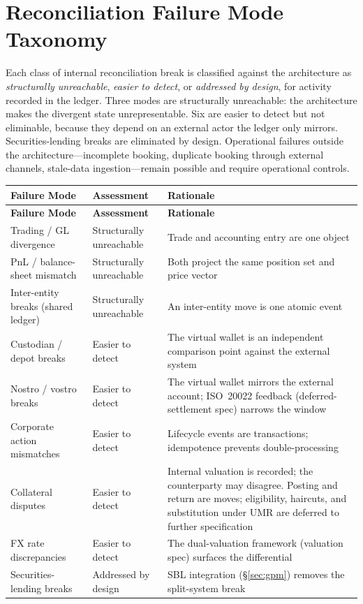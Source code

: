 \section{Reconciliation Failure Mode Taxonomy}
\label{sec:appC}\label{app:reconciliation}

Each class of internal reconciliation break is classified against the architecture as \emph{structurally unreachable}, \emph{easier to detect}, or \emph{addressed by design}, for activity recorded in the ledger. Three modes are structurally unreachable: the architecture makes the divergent state unrepresentable. Six are easier to detect but not eliminable, because they depend on an external actor the ledger only mirrors. Securities-lending breaks are eliminated by design. Operational failures outside the architecture---incomplete booking, duplicate booking through external channels, stale-data ingestion---remain possible and require operational controls.

\begin{center}
\begin{longtable}{p{4.3cm} p{3cm} p{5.7cm}}
\toprule
\textbf{Failure Mode} & \textbf{Assessment} & \textbf{Rationale} \\
\midrule
\endfirsthead
\toprule
\textbf{Failure Mode} & \textbf{Assessment} & \textbf{Rationale} \\
\midrule
\endhead
Trading / GL divergence & Structurally unreachable & Trade and accounting entry are one object \\
\midrule
PnL / balance-sheet mismatch & Structurally unreachable & Both project the same position set and price vector \\
\midrule
Inter-entity breaks (shared ledger) & Structurally unreachable & An inter-entity move is one atomic event \\
\midrule
Custodian / depot breaks & Easier to detect & The virtual wallet is an independent comparison point against the external system \\
\midrule
Nostro / vostro breaks & Easier to detect & The virtual wallet mirrors the external account; ISO~20022 feedback (deferred-settlement spec) narrows the window \\
\midrule
Corporate action mismatches & Easier to detect & Lifecycle events are transactions; idempotence prevents double-processing \\
\midrule
Collateral disputes & Easier to detect & Internal valuation is recorded; the counterparty may disagree. Posting and return are moves; eligibility, haircuts, and substitution under UMR are deferred to further specification \\
\midrule
FX rate discrepancies & Easier to detect & The dual-valuation framework (valuation spec) surfaces the differential \\
\midrule
Securities-lending breaks & Addressed by design & SBL integration (\S\ref{sec:gpm}) removes the split-system break \\
\bottomrule
\end{longtable}
\end{center}


